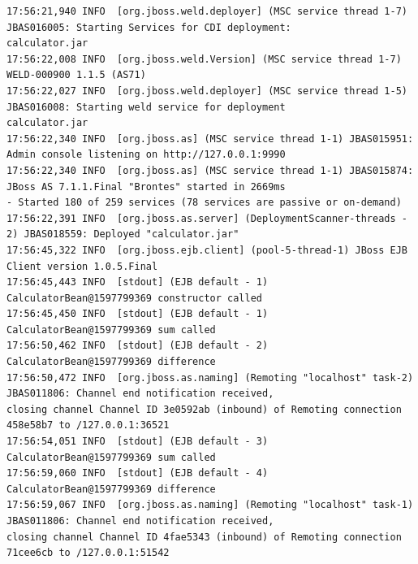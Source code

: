 \documentclass[a4paper,10pt]{scrreprt}
\begin{document}
\begin{enumerate}
\begin{lstlisting}[language={}]
17:56:21,940 INFO  [org.jboss.weld.deployer] (MSC service thread 1-7) JBAS016005: Starting Services for CDI deployment: 
calculator.jar
17:56:22,008 INFO  [org.jboss.weld.Version] (MSC service thread 1-7) WELD-000900 1.1.5 (AS71)
17:56:22,027 INFO  [org.jboss.weld.deployer] (MSC service thread 1-5) JBAS016008: Starting weld service for deployment 
calculator.jar
17:56:22,340 INFO  [org.jboss.as] (MSC service thread 1-1) JBAS015951: Admin console listening on http://127.0.0.1:9990
17:56:22,340 INFO  [org.jboss.as] (MSC service thread 1-1) JBAS015874: JBoss AS 7.1.1.Final "Brontes" started in 2669ms 
- Started 180 of 259 services (78 services are passive or on-demand)
17:56:22,391 INFO  [org.jboss.as.server] (DeploymentScanner-threads - 2) JBAS018559: Deployed "calculator.jar"
17:56:45,322 INFO  [org.jboss.ejb.client] (pool-5-thread-1) JBoss EJB Client version 1.0.5.Final
17:56:45,443 INFO  [stdout] (EJB default - 1) CalculatorBean@1597799369 constructor called
17:56:45,450 INFO  [stdout] (EJB default - 1) CalculatorBean@1597799369 sum called
17:56:50,462 INFO  [stdout] (EJB default - 2) CalculatorBean@1597799369 difference
17:56:50,472 INFO  [org.jboss.as.naming] (Remoting "localhost" task-2) JBAS011806: Channel end notification received, 
closing channel Channel ID 3e0592ab (inbound) of Remoting connection 458e58b7 to /127.0.0.1:36521
17:56:54,051 INFO  [stdout] (EJB default - 3) CalculatorBean@1597799369 sum called
17:56:59,060 INFO  [stdout] (EJB default - 4) CalculatorBean@1597799369 difference
17:56:59,067 INFO  [org.jboss.as.naming] (Remoting "localhost" task-1) JBAS011806: Channel end notification received, 
closing channel Channel ID 4fae5343 (inbound) of Remoting connection 71cee6cb to /127.0.0.1:51542

\end{lstlisting}





\end{enumerate}
\end{document}
